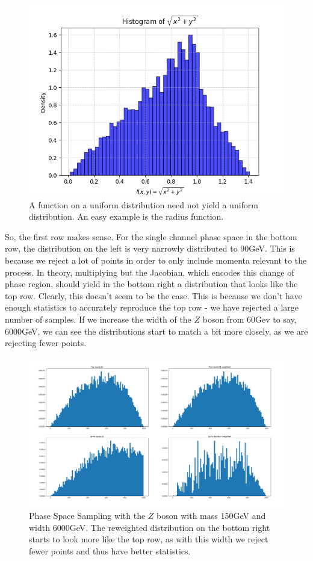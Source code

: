 \begin{figure}[H]
\begin{minipage}{.4\textwidth}
    \includegraphics[width=\textwidth]{tex/ims/unirad.png}
    
    \end{minipage}
     \caption{A function on a uniform distribution need not yield a uniform distribution. An easy example is the radius function.}
             \end{figure}

So, the first row makes sense. 
For the single channel phase space in the bottom row, the distribution on the left is very narrowly distributed to 90GeV. This is because we reject a lot of points in order to only include momenta relevant to the process. In theory, multiplying but the Jacobian, which encodes this change of phase region, should yield in the bottom right a distribution that looks like the top row. Clearly, this doesn't seem to be the case. This is because we don't have enough statistics to accurately reproduce the top row - we have rejected a large number of samples. If we increase the width of the $Z$ boson from 60Gev to say, 6000GeV, we can see the distributions start to match a bit more closely, as we are rejecting fewer points.

\begin{figure}[H]
    \centering
    \includegraphics[width=0.75\linewidth]{tex/ims/phasespace2.png}
    \caption{Phase Space Sampling with the $Z$ boson with mass 150GeV and width 6000GeV. The reweighted distribution on the bottom right starts to look more like the top row, as with this width we reject fewer points and thus have better statistics.}
    \label{fig:phase2}
\end{figure}



